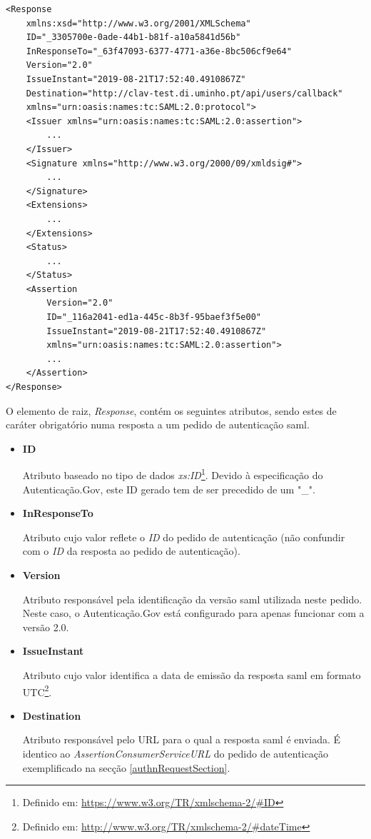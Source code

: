 \begin{lstlisting}
<Response 
    xmlns:xsd="http://www.w3.org/2001/XMLSchema" 
    ID="_3305700e-0ade-44b1-b81f-a10a5841d56b" 
    InResponseTo="_63f47093-6377-4771-a36e-8bc506cf9e64" 
    Version="2.0" 
    IssueInstant="2019-08-21T17:52:40.4910867Z" 
    Destination="http://clav-test.di.uminho.pt/api/users/callback"
    xmlns="urn:oasis:names:tc:SAML:2.0:protocol">
    <Issuer xmlns="urn:oasis:names:tc:SAML:2.0:assertion">
        ...
    </Issuer>
    <Signature xmlns="http://www.w3.org/2000/09/xmldsig#">
        ...
    </Signature>
    <Extensions>
        ...
    </Extensions>
    <Status>
        ...
    </Status>
    <Assertion 
        Version="2.0" 
        ID="_116a2041-ed1a-445c-8b3f-95baef3f5e00" 
        IssueInstant="2019-08-21T17:52:40.4910867Z" 
        xmlns="urn:oasis:names:tc:SAML:2.0:assertion">
        ...
    </Assertion>
</Response>
\end{lstlisting}

\vspace{-15mm}
O elemento de raiz, \emph{Response}, contém os seguintes atributos, sendo estes de caráter obrigatório numa resposta a um pedido de autenticação \gls{saml}.

\begin{itemize}
    \item \textbf{ID}
    
    Atributo baseado no tipo de dados \emph{xs:ID}\footnote{Definido em: \url{https://www.w3.org/TR/xmlschema-2/\#ID}}. Devido à especificação do Autenticação.Gov, este ID gerado tem de ser precedido de um "\_".
    
    \item \textbf{InResponseTo}
    
    Atributo cujo valor reflete o \emph{ID} do pedido de autenticação (não confundir com o \emph{ID} da resposta ao pedido de autenticação).
    
    \item \textbf{Version}
    
    Atributo responsável pela identificação da versão \gls{saml} utilizada neste pedido. Neste caso, o Autenticação.Gov está configurado para apenas funcionar com a versão 2.0.
    
    \item \textbf{IssueInstant}
    
    Atributo cujo valor identifica a data de emissão da resposta \gls{saml} em formato UTC\footnote{Definido em: \url{http://www.w3.org/TR/xmlschema-2/\#dateTime}}.
    
    \item \textbf{Destination}
    
    Atributo responsável pelo URL para o qual a resposta \gls{saml} é enviada. É identico ao \emph{AssertionConsumerServiceURL} do pedido de autenticação exemplificado na secção \ref{authnRequestSection}.
\end{itemize}

